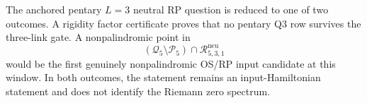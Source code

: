 \begin{principle}
\label{prin:innovation-input-pentary-three-link-boundary}
The anchored pentary $L=3$ neutral RP question is reduced to one of two
outcomes. A rigidity factor certificate proves that no pentary Q3 row
survives the three-link gate. A nonpalindromic point in
$$
(\mathcal Q_5\setminus\mathcal P_5)
\cap
\mathcal R_{5,3,1}^{\mathrm{neu}}
$$
would be the first genuinely nonpalindromic OS/RP input candidate at this
window. In both outcomes, the statement remains an input-Hamiltonian
statement and does not identify the Riemann zero spectrum.
\end{principle}
